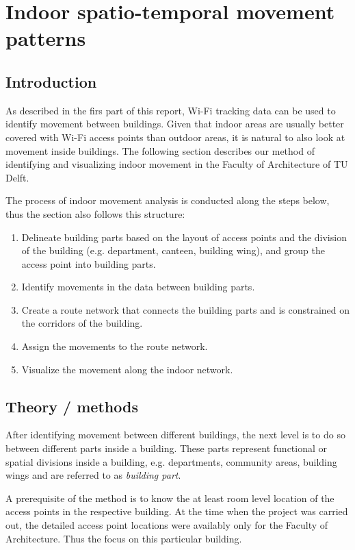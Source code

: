 \chapter{Indoor spatio-temporal movement patterns}
\section{Introduction}
As described in the firs part of this report, Wi-Fi tracking data can be used to
identify movement between buildings. Given that indoor areas are usually better
covered with Wi-Fi access points than outdoor areas, it is natural to also look
at movement inside buildings. The following section describes our method of
identifying and visualizing indoor movement in the Faculty of Architecture of TU
Delft.

The process of indoor movement analysis is conducted along the steps below,
thus the section also follows this structure:

\begin{enumerate}
    \item Delineate building parts based on the layout of access points
and the division of the building (e.g. department, canteen, building wing), and
group the access point into building parts.
    \item Identify movements in the data between building parts.
    \item Create a route network that connects the building parts and
    is constrained on the corridors of the building.
    \item Assign the movements to the route network.
    \item Visualize the movement along the indoor network.
\end{enumerate}

\section{Theory / methods}
After identifying movement between different buildings, the next level is to do
so between different parts inside a building. These parts represent
functional or spatial divisions inside a building, e.g. departments, community
areas, building wings and are referred to as \textit{building part}.

A prerequisite of the method is to know the at least room level location of the
access points in the respective building. At the time when the project
was carried out, the detailed access point locations were availably only for the
Faculty of Architecture. Thus the focus on this particular building.

